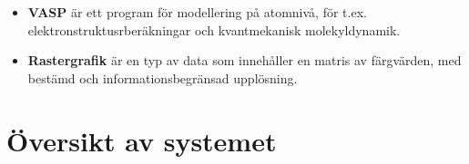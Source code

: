\documentclass[a4paper,12pt]{article}
\begin{document}
\begin{itemize}
\item \textbf{VASP} är ett program för modellering på atomnivå, för t.ex. elektronstruktusrberäkningar och kvantmekanisk molekyldynamik.
\cite{VASP}

\item \textbf{Rastergrafik} är en typ av data som innehåller en matris av färgvärden, med bestämd och informationsbegränsad upplösning.
\cite{raster}


\end{itemize}

\section{Översikt av systemet}

\newpage
{}
\printbibliography{}
\end{document}
